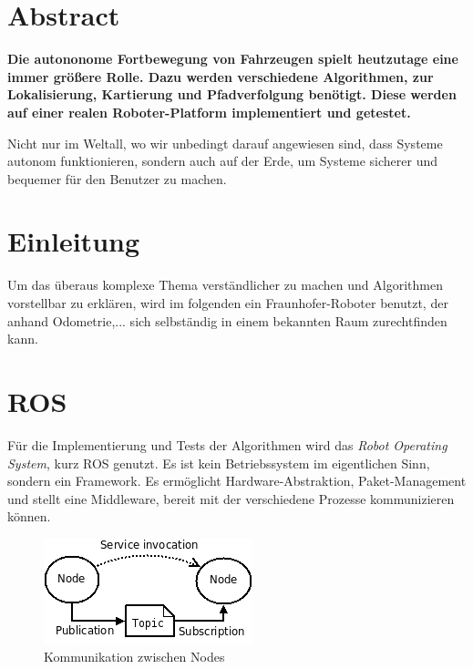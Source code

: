 \documentclass[11pt,a4paper]{article}
\begin{document}
\section*{Abstract}
{
\textbf{Die autononome Fortbewegung von Fahrzeugen spielt heutzutage eine immer gr\"o\ss{}ere Rolle. Dazu werden verschiedene Algorithmen, zur Lokalisierung, Kartierung und Pfadverfolgung ben\"otigt. Diese werden auf einer realen Roboter-Platform implementiert und getestet.}

Nicht nur im Weltall, wo wir unbedingt darauf angewiesen sind, dass Systeme autonom funktionieren, sondern auch auf der Erde, um Systeme sicherer und bequemer f\"ur den Benutzer zu machen. 


\section{Einleitung}
Um das überaus komplexe Thema verst\"andlicher zu machen und Algorithmen vorstellbar zu erkl\"aren, wird im folgenden ein Fraunhofer-Roboter benutzt, der anhand Odometrie,... sich selbst\"andig in einem bekannten Raum zurechtfinden kann.

\section{ROS}
F\"ur die Implementierung und Tests der Algorithmen wird das \textit{Robot Operating System}, kurz ROS genutzt. Es ist kein Betriebssystem im eigentlichen Sinn, sondern ein Framework. Es erm\"oglicht Hardware-Abstraktion, Paket-Management und stellt eine Middleware, bereit mit der verschiedene Prozesse kommunizieren k\"onnen. \cite{rosWiki}

\begin{figure}[h]
	\includegraphics[width=\linewidth]{pictures/ROS_basic_concepts.png}
	\caption{Kommunikation zwischen Nodes}
\end{figure}

}
\end{document}
